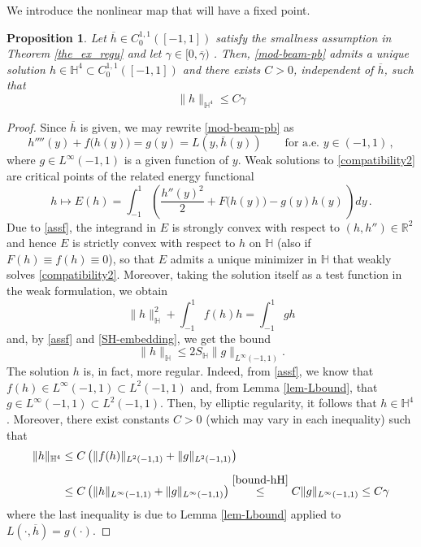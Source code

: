 \documentclass[11pt,a4paper]{amsart}
\newtheorem{proposition}{Proposition}
\theoremstyle{remark}
\theoremstyle{definition}
\numberwithin{equation}{section}
\numberwithin{proposition}{section}
\begin{document}
We introduce the nonlinear map that will have a fixed point.
\begin{proposition}\label{prop-exi-beam}
Let $\overline{h}\in C^{1,1}_0([-1,1]) $ satisfy the smallness assumption  in Theorem \ref{the_ex_regu} and let $\gamma \in [0, \overline{\gamma})$ . Then, \eqref{mod-beam-pb} admits a unique solution  $h\in \mathbb{H}^4\subset C^{1,1}_0([-1,1])$ and there exists $C>0$, independent of $\overline{h}$,  such that
\begin{equation}\label{bound-beam}
    \| h \|_{\mathbb{H}^4}\leq C\gamma
\end{equation}
\end{proposition}
\begin{proof}Since $\overline{h}$ is given, we may rewrite \eqref{mod-beam-pb} as
\begin{equation}\label{compatibility2}
h''''(y)+f\big(h(y)\big)=g(y)= L(y, \overline{h}(y))\qquad \text{for a.e. } y\in(-1,1)\, ,
\end{equation}where $g\in L^\infty(-1,1)$ is a given function of $y$. Weak solutions to \eqref{compatibility2} are critical points  of the related energy functional
\begin{equation}\label{energy-fun}
 h\mapsto E(h)=\int_{-1}^{1}\left(\frac{h''(y)^{2}}2 +F\big(h(y)\big) - g(y)h(y)\, \right)dy\,.
\end{equation} Due to \eqref{assf}, the integrand in $E$ is strongly convex with respect to $(h, h'')\in \mathbb{R}^2$ and hence $E$ is strictly convex with respect to $h$ on $\mathbb{H}$ (also if $F(h)\equiv f(h)\equiv0$), so that $E$ admits a unique minimizer in $\mathbb{H}$ that weakly solves \eqref{compatibility2}.
 Moreover, taking the solution itself as a test function in the weak formulation, we obtain
\begin{equation}
    \|h\|^2_{\mathbb{H}} + \int_{-1}^1 f(h)h  =\int_{-1}^1 gh
\end{equation}
and, by \eqref{assf} and \eqref{SH-embedding}, we get the bound
    \begin{equation}\label{bound-hH}
       \|h\|_{\mathbb{H}} \leq 2S_{\mathbb{H}} \|g\|_{L^{\infty}(-1,1)}.
    \end{equation}
   The solution $h$ is, in fact, more regular. Indeed,  from \eqref{assf}, we know that $f(h)\in L^\infty(-1,1)\subset L^2(-1,1)$ and, from Lemma \ref{lem-Lbound}, that $g\in L^\infty(-1,1)\subset L^2(-1,1)$. Then, by elliptic regularity, it follows that $h\in \mathbb{H}^4 $. Moreover, there exist constants $C>0$ (which may vary in each inequality) such that
\begin{equation*}\begin{aligned}
\|h\|_{\mathbb{H}^4}& \leq C \left(\|f(h)\|_{L^2(-1,1)} + \|g\|_{L^2(-1,1)}\right) \\[5pt]&\leq C\left( \|h\|_{L^\infty(-1,1)} + \|g\|_{L^\infty(-1,1)}\right)\stackrel{\eqref{bound-hH}}\leq   C\|g\|_{L^\infty(-1,1)}\leq C \gamma
\end{aligned}
\end{equation*} where the last inequality is due to Lemma \ref{lem-Lbound} applied to $L(\cdot, \overline{h})=g(\cdot)$.
\end{proof}
\end{document}
